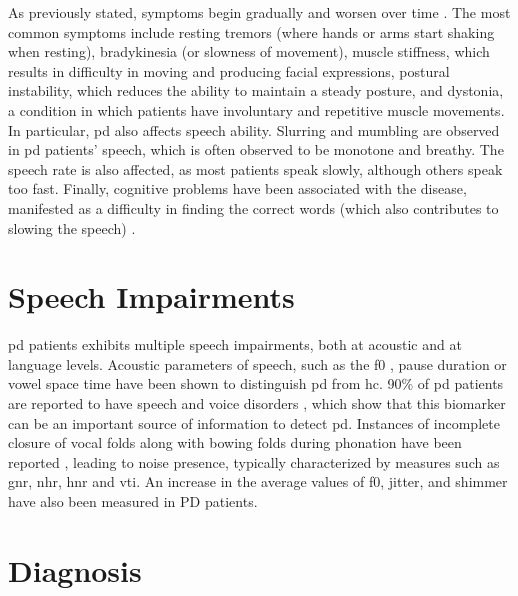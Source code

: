 As previously stated, symptoms begin gradually and worsen over time \cite{parkinson}. The most common symptoms include resting tremors (where hands or arms start shaking when resting), bradykinesia (or slowness of movement), muscle stiffness, which results in difficulty in moving and producing facial expressions, postural instability, which reduces the ability to maintain a steady posture, and dystonia, a condition in which patients have involuntary and repetitive muscle movements. In particular, \gls{pd} also affects speech ability. Slurring and mumbling are observed in \gls{pd} patients' speech, which is often observed to be monotone and breathy. The speech rate is also affected, as most patients speak slowly, although others speak too fast. Finally, cognitive problems have been associated with the disease, manifested as a difficulty in finding the correct words (which also contributes to slowing the speech) \cite{parkinson_symptoms}.


\section{Speech Impairments}

\gls{pd} patients exhibits multiple speech impairments, both at acoustic and at language levels. Acoustic parameters of speech, such as the \gls{f0} \cite{parkinson_disfluency_harel}, pause duration \cite{parkinson_disfluency_harel} or vowel space time \cite{parkinson_acoustic_analysis_goberman} have been shown to distinguish \gls{pd} from \gls{hc}. 90\% of \gls{pd} patients are reported to have speech and voice disorders \cite{parkinson_90_percent}, which show that this biomarker can be an important source of information to detect \gls{pd}. 
Instances of incomplete closure of vocal folds along with bowing folds during phonation have been reported \cite{features_explained}, leading to noise presence, typically characterized by measures such as \gls{gnr}, \gls{nhr}, \gls{hnr} and \gls{vti}. An increase in the average values of \gls{f0}, jitter, and shimmer have also been measured in PD patients.

\section{Diagnosis}

